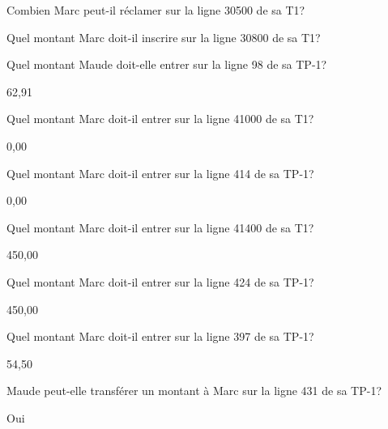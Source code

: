 \begin{question}
	Combien Marc peut-il réclamer sur la ligne 30500 de sa T1?
\end{question}

\begin{question}
	Quel montant Marc doit-il inscrire sur la ligne 30800 de sa T1?
\end{question}

\begin{question}
	Quel montant Maude doit-elle entrer sur la ligne 98 de sa TP-1?
\end{question}
62,91

\begin{question}
	Quel montant Marc doit-il entrer sur la ligne 41000 de sa T1?
\end{question}
0,00

\begin{question}
	Quel montant Marc doit-il entrer sur la ligne 414 de sa TP-1?
\end{question}
0,00

\begin{question}
	Quel montant Marc doit-il entrer sur la ligne 41400 de sa T1?
\end{question}
450,00

\begin{question}
	Quel montant Marc doit-il entrer sur la ligne 424 de sa TP-1?
\end{question}
450,00

\begin{question}
	Quel montant Marc doit-il entrer sur la ligne 397 de sa TP-1?
\end{question}
54,50

\begin{question}
	Maude peut-elle transférer un montant à Marc sur la ligne 431 de sa TP-1?
\end{question}
Oui


